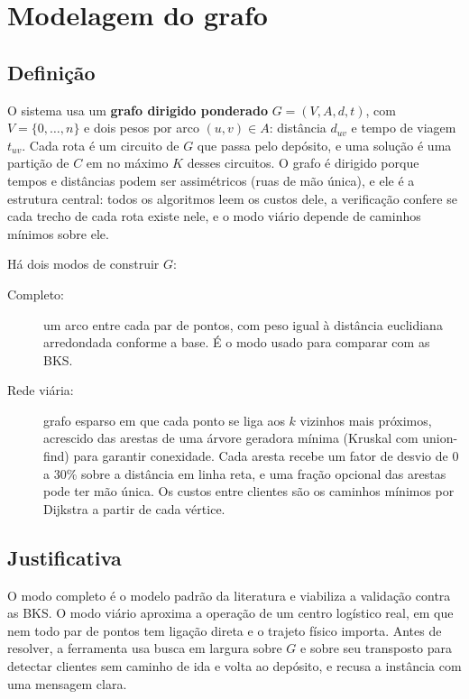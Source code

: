 \documentclass[12pt]{article}
\begin{document}
\section{Modelagem do grafo}

\subsection{Definição}

O sistema usa um \textbf{grafo dirigido ponderado} $G=(V,A,d,t)$, com $V=\{0,\dots,n\}$ e dois pesos por arco $(u,v)\in A$: distância $d_{uv}$ e tempo de viagem $t_{uv}$. Cada rota é um circuito de $G$ que passa pelo depósito, e uma solução é uma partição de $C$ em no máximo $K$ desses circuitos. O grafo é dirigido porque tempos e distâncias podem ser assimétricos (ruas de mão única), e ele é a estrutura central: todos os algoritmos leem os custos dele, a verificação confere se cada trecho de cada rota existe nele, e o modo viário depende de caminhos mínimos sobre ele.

Há dois modos de construir $G$:
\begin{description}
  \item[Completo:] um arco entre cada par de pontos, com peso igual à distância euclidiana arredondada conforme a base. É o modo usado para comparar com as BKS.
  \item[Rede viária:] grafo esparso em que cada ponto se liga aos $k$ vizinhos mais próximos, acrescido das arestas de uma árvore geradora mínima (Kruskal com union-find) para garantir conexidade. Cada aresta recebe um fator de desvio de 0 a 30\% sobre a distância em linha reta, e uma fração opcional das arestas pode ter mão única. Os custos entre clientes são os caminhos mínimos por Dijkstra a partir de cada vértice.
\end{description}

\subsection{Justificativa}

O modo completo é o modelo padrão da literatura e viabiliza a validação contra as BKS. O modo viário aproxima a operação de um centro logístico real, em que nem todo par de pontos tem ligação direta e o trajeto físico importa. Antes de resolver, a ferramenta usa busca em largura sobre $G$ e sobre seu transposto para detectar clientes sem caminho de ida e volta ao depósito, e recusa a instância com uma mensagem clara.
\end{document}
